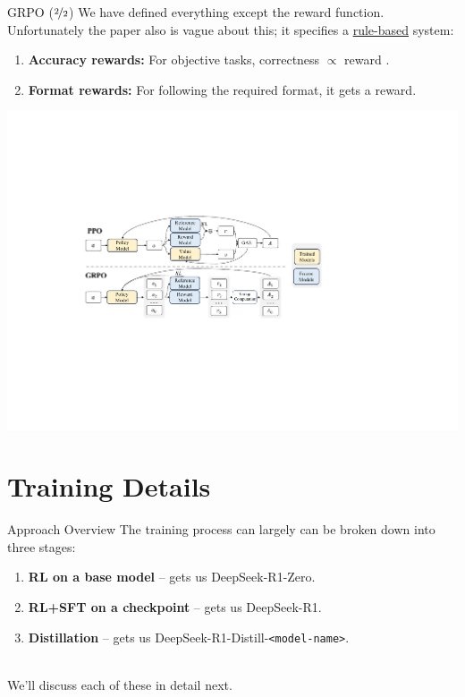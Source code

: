 \documentclass{beamer}
\begin{document}
\begin{frame}{GRPO ($\nicefrac{2}{2}$)}
	We have defined everything except the reward function. \pause Unfortunately the paper also is vague about this\pause; it specifies a \underline{rule-based} system:
	\begin{enumerate}[label=\arabic*.]
		\item \textbf{Accuracy rewards:} For objective tasks, correctness $\propto$ reward .\pause
		\item \textbf{Format rewards:} For following the required format, it gets a reward. \pause
	\end{enumerate}

	\begin{center}
		\includegraphics[width=\textwidth]{img/GRPO.pdf}
	\end{center}
\end{frame}

\section{Training Details}
\begin{frame}{Approach Overview}
	The training process can largely can be broken down into three stages:
	\begin{enumerate}[label=\arabic*.]
		\item \textbf{RL on a base model} -- gets us DeepSeek-R1-Zero.
		\item \textbf{RL+SFT on a checkpoint} -- gets us DeepSeek-R1.
		\item \textbf{Distillation} -- gets us DeepSeek-R1-Distill-\texttt{<model-name>}.
	\end{enumerate}
	~ \\

	We'll discuss each of these in detail next.
\end{frame}
\end{document}
